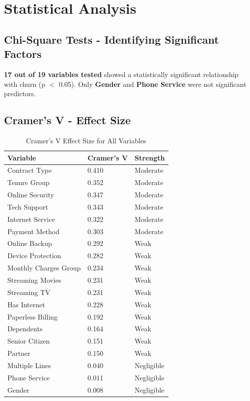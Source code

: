 \documentclass[11pt,a4paper]{article}
\begin{document}
\section{Statistical Analysis}

\subsection{Chi-Square Tests - Identifying Significant Factors}

\begin{tcolorbox}[
    colback=primary!5,
    colframe=primary!50,
    arc=8pt,
    left=12pt,
    right=12pt
]
\textbf{17 out of 19 variables tested} showed a statistically significant relationship with churn (p $<$ 0.05). Only \textbf{Gender} and \textbf{Phone Service} were not significant predictors.
\end{tcolorbox}

\subsection{Cramer's V - Effect Size}

\begin{table}[H]
\centering
\begin{tabular}{p{5cm} p{3cm} p{3cm}}
\toprule
\rowcolor{primary!10}
\textbf{Variable} & \textbf{Cramer's V} & \textbf{Strength} \\
\midrule
Contract Type & 0.410 & Moderate \\
Tenure Group & 0.352 & Moderate \\
Online Security & 0.347 & Moderate \\
Tech Support & 0.343 & Moderate \\
Internet Service & 0.322 & Moderate \\
Payment Method & 0.303 & Moderate \\
Online Backup & 0.292 & Weak \\
Device Protection & 0.282 & Weak \\
Monthly Charges Group & 0.234 & Weak \\
Streaming Movies & 0.231 & Weak \\
Streaming TV & 0.231 & Weak \\
Has Internet & 0.228 & Weak \\
Paperless Billing & 0.192 & Weak \\
Dependents & 0.164 & Weak \\
Senior Citizen & 0.151 & Weak \\
Partner & 0.150 & Weak \\
Multiple Lines & 0.040 & Negligible \\
Phone Service & 0.011 & Negligible \\
Gender & 0.008 & Negligible \\
\bottomrule
\end{tabular}
\caption{Cramer's V Effect Size for All Variables}
\end{table}
\end{document}
